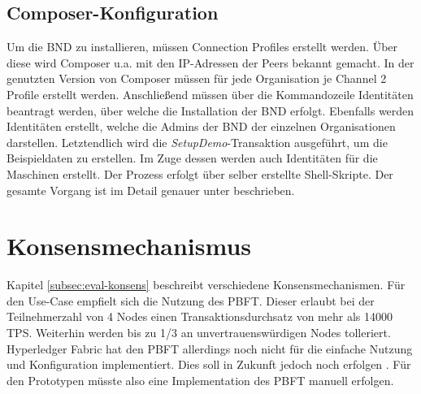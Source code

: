 \subsection{Composer-Konfiguration}
Um die BND zu installieren, müssen Connection Profiles erstellt werden. Über diese wird Composer u.a. mit den IP-Adressen der Peers bekannt gemacht. In der genutzten Version von Composer müssen für jede Organisation je Channel 2 Profile erstellt werden. Anschließend müssen über die Kommandozeile Identitäten beantragt werden, über welche die Installation der BND erfolgt. Ebenfalls werden Identitäten erstellt, welche die Admins der BND der einzelnen Organisationen darstellen. Letztendlich wird die \textit{SetupDemo}-Transaktion ausgeführt, um die Beispieldaten zu erstellen. Im Zuge dessen werden auch Identitäten für die Maschinen erstellt. Der Prozess erfolgt über selber erstellte Shell-Skripte. Der gesamte Vorgang ist im Detail genauer unter \cite{MultiOrgDeployment} beschrieben.

\section{Konsensmechanismus}
\label{sec:consensus-choose}
Kapitel \ref{subsec:eval-konsens} beschreibt verschiedene Konsensmechanismen. Für den Use-Case empfielt sich die Nutzung des PBFT. Dieser erlaubt bei der Teilnehmerzahl von 4 Nodes einen Transaktionsdurchsatz von mehr als 14000 TPS. Weiterhin werden bis zu 1/3 an unvertrauenswürdigen Nodes tolleriert. Hyperledger Fabric hat den PBFT allerdings noch nicht für die einfache Nutzung und Konfiguration implementiert. Dies soll in Zukunft jedoch noch erfolgen \cite{PluggableConsensusImplementations}. Für den Prototypen müsste also eine Implementation des PBFT manuell erfolgen.

